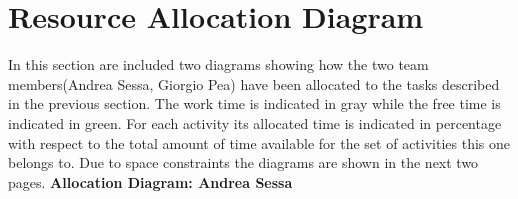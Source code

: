 \documentclass[11pt,titlepage]{article} %
\begin{document}
\section{Resource Allocation Diagram}
  In this section are included two diagrams showing how the two team members(Andrea Sessa, Giorgio Pea) have been allocated to the tasks
  described in the previous section.\newline
  The work time is indicated in gray while the free time is indicated in green.
  For each activity its allocated time is indicated in percentage with respect to the total amount of time available for the set of activities this one belongs to.\newline
  Due to space constraints the diagrams are shown in the next two pages.\newline
  \newpage
  \textbf{Allocation Diagram: Andrea Sessa}\newline
\end{document}
